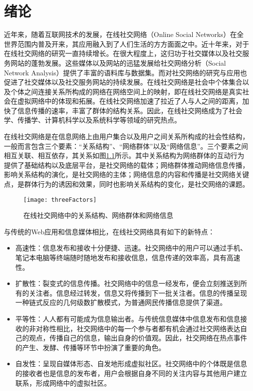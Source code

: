 \chapter{绪论}
\label{chap01}
近年来，随着互联网技术的发展，在线社交网络（Online Social Networks）在全世界范围内普及开来，其应用融入到了人们生活的方方面面之中。近十年来，对于在线社交网络的研究一直持续增长。在很大程度上，这归功于社交媒体以及社交服务网站的蓬勃发展。这些媒体以及网站的迅猛发展给社交网络分析（Social Network Analysis）提供了丰富的语料库与数据集。而对社交网络的研究与应用也促进了社交媒体以及社交服务网站的持续发展。在线社交网络是社会中个体集合以及个体之间连接关系所构成的网络在网络空间上的映射，即在线社交网络是真实社会在虚拟网络中的体现和拓展。在线社交网络加速了拉近了人与人之间的距离，加快了信息传播的速率，丰富了群体的结构关系。因此，在线社交网络成为了社会学、传播学、计算机科学以及系统科学等领域的研究热点。

在线社交网络是在信息网络上由用户集合以及用户之间关系所构成的社会性结构，一般而言包含三个要素：“关系结构”、“网络群体”以及“网络信息”。三个要素之间相互关联、相互依存，其关系如图\ref{fig:threeFactors}所示。其中关系结构为网络群体的互动行为提供了基础结构以及底层平台，是社交网络的载体；网络群体推动网络信息传播，影响关系结构的演化，是社交网络的主体；网络信息的内容和传播是社交网络关键点，是群体行为的诱因和效果，同时也影响关系结构的变化，是社交网络的课题。

\begin{figure}[!ht]
    \centering
    \texttt{[image: threeFactors]}
    \caption{在线社交网络中的关系结构、网络群体和网络信息}
    \label{fig:threeFactors}
\end{figure}

与传统的Web应用和信息媒体相比，在线社交网络具有如下的新特点：
\begin{itemize}
	\item 高速性：信息发布和接收十分便捷、迅速。社交网络中的用户可以通过手机、笔记本电脑等终端随时随地发布和接收信息，信息传递的效率高，具有高速性。
	\item 扩散性：裂变式的信息传播。社交网络中的信息一经发布，便会立刻推送到所有的关注者。信息经过转发，信息又将传播到下一批关注者。信息的传播呈现一种链式反应的几何级数扩散模式，为普通网民传播信息提供了渠道。
	\item 平等性：人人都有可能成为信息输出者。与传统信息媒体中信息发布和信息接收的非对称性相比，社交网络中的每一个参与者都有机会通过社交网络表达自己的观点，传播自己的信息，输出自身的价值观。因此，社交网络在热点事件的产生、发酵、传播等环节中扮演了重要的角色。
	\item 自发性：呈现自媒体形态、自发地形成虚拟社区。社交网络中的个体既是信息的接收者也是信息的发布者，用户会根据自身不同的关注内容与其他用户建立联系，形成网络中的虚拟社区。
\end{itemize}


